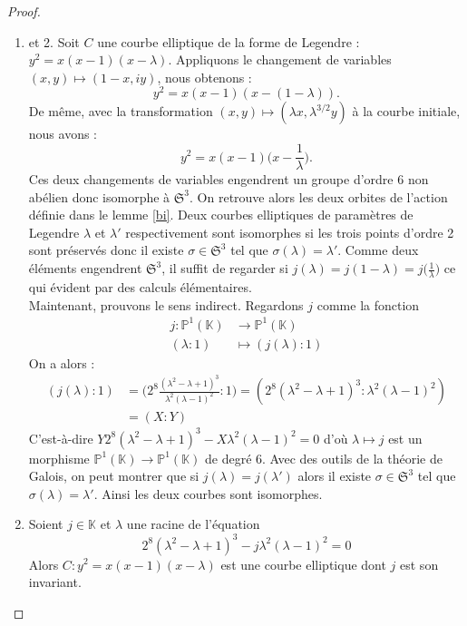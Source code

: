 \documentclass[a4paper]{article}
\begin{document}
\begin{proof}
\begin{enumerate}
\item et 2. 
Soit $C$ une courbe elliptique de la forme de Legendre : $y^2=x(x-1)(x-\lambda)$. Appliquons le changement de variables $(x,y) \mapsto (1-x,iy)$, nous obtenons :
\begin{equation*}
y^2=x(x-1)(x-(1-\lambda)).
\end{equation*}
De même, avec la transformation $(x,y) \mapsto (\lambda x, \lambda^{3/2}y)$ à la courbe initiale, nous avons :
\begin{equation*}
y^2=x(x-1)\Big(x-\frac{1}{\lambda}\Big).
\end{equation*}
Ces deux changements de variables engendrent un groupe d'ordre 6 non abélien donc isomorphe à $\mathfrak{S}^3$. On retrouve alors les deux orbites de l'action définie dans le lemme \ref{bi}.
Deux courbes elliptiques de paramètres de Legendre $\lambda$ et $\lambda'$ respectivement sont isomorphes si les trois points d'ordre 2 sont préservés 
donc il existe $\sigma \in \mathfrak{S}^3$ tel que $\sigma(\lambda)=\lambda'$.
Comme deux éléments engendrent $\mathfrak{S}^3$, il suffit de regarder si $j(\lambda)=j(1-\lambda)=j\Big(\frac{1}{\lambda}\Big)$ ce qui évident par des calculs élémentaires. \\
Maintenant, prouvons le sens indirect.
Regardons $j$ comme la fonction 
\begin{align*}
j : \mathbb{P}^1(\mathbb{K}) &\rightarrow \mathbb{P}^1(\mathbb{K}) \\
(\lambda : 1) &\mapsto (j(\lambda):1)
\end{align*}
On a alors :
\begin{align*}
 (j(\lambda):1) &=\Big(2^8 \frac{(\lambda^2-\lambda+1)^3}{\lambda^2(\lambda-1)^2} : 1\Big)=(2^8(\lambda^2-\lambda+1)^3 : \lambda^2(\lambda-1)^2) \\
 &= (X:Y)
\end{align*}
C'est-à-dire $Y2^8(\lambda^2-\lambda+1)^3-X\lambda^2(\lambda-1)^2=0$ d'où $\lambda \mapsto j$ est un morphisme $\mathbb{P}^1(\mathbb{K}) \rightarrow \mathbb{P}^1(\mathbb{K})$ de degré 6. Avec des outils de la théorie de Galois, on peut montrer que si $j(\lambda)=j(\lambda')$ alors il existe $\sigma \in \mathfrak{S}^3$ tel que $\sigma(\lambda)=\lambda'$. Ainsi les deux courbes sont isomorphes.
\item Soient $j \in \mathbb{K}$ et $\lambda$ une racine de l'équation
\begin{equation*}
2^8(\lambda^2-\lambda+1)^3-j\lambda^2(\lambda-1)^2=0
\end{equation*}
Alors $C : y^2=x(x-1)(x-\lambda)$ est une courbe elliptique dont $j$ est son invariant.
\end{enumerate}
\end{proof}
\end{document}
